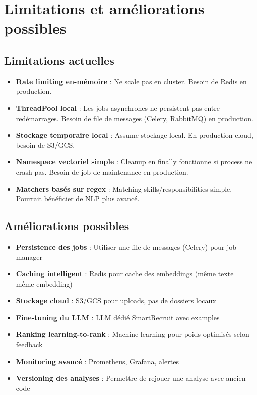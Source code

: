 \documentclass[12pt,a4paper,oneside]{book}
\begin{document}
\section{Limitations et améliorations possibles}

\subsection{Limitations actuelles}

\begin{itemize}
    \item \textbf{Rate limiting en-mémoire} : Ne scale pas en cluster. Besoin de Redis en production.
    
    \item \textbf{ThreadPool local} : Les jobs asynchrones ne persistent pas entre redémarrages. Besoin de file de messages (Celery, RabbitMQ) en production.
    
    \item \textbf{Stockage temporaire local} : Assume stockage local. En production cloud, besoin de S3/GCS.
    
    \item \textbf{Namespace vectoriel simple} : Cleanup en finally fonctionne si process ne crash pas. Besoin de job de maintenance en production.
    
    \item \textbf{Matchers basés sur regex} : Matching skills/responsibilities simple. Pourrait bénéficier de NLP plus avancé.
\end{itemize}

\subsection{Améliorations possibles}

\begin{itemize}
    \item \textbf{Persistence des jobs} : Utiliser une file de messages (Celery) pour job manager
    
    \item \textbf{Caching intelligent} : Redis pour cache des embeddings (même texte = même embedding)
    
    \item \textbf{Stockage cloud} : S3/GCS pour uploads, pas de dossiers locaux
    
    \item \textbf{Fine-tuning du LLM} : LLM dédié SmartRecruit avec examples
    
    \item \textbf{Ranking learning-to-rank} : Machine learning pour poids optimisés selon feedback
    
    \item \textbf{Monitoring avancé} : Prometheus, Grafana, alertes
    
    \item \textbf{Versioning des analyses} : Permettre de rejouer une analyse avec ancien code
\end{itemize}
\end{document}
